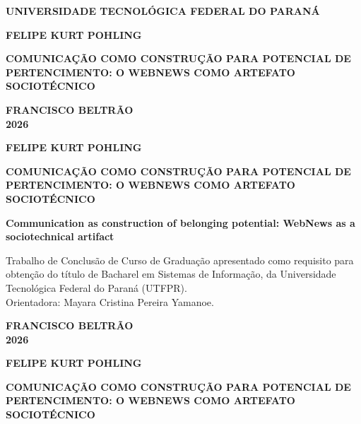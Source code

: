 \documentclass[12pt,a4paper]{article}
\newcommand{\autor}{FELIPE KURT POHLING}
\newcommand{\titulo}{COMUNICAÇÃO COMO CONSTRUÇÃO PARA POTENCIAL DE PERTENCIMENTO: O WEBNEWS COMO ARTEFATO SOCIOTÉCNICO}
\newcommand{\tituloingles}{Communication as construction of belonging potential: WebNews as a sociotechnical artifact}
\newcommand{\cidade}{FRANCISCO BELTRÃO}
\newcommand{\ano}{2026}
\newcommand{\natureza}{Trabalho de Conclusão de Curso de Graduação
  apresentado como requisito para obtenção do título de Bacharel em
  Sistemas de Informação, da Universidade Tecnológica Federal do Paraná
  (UTFPR).}
\begin{document}
\frenchspacing

\begin{center}
  \begin{onehalfspace}
  \textbf{UNIVERSIDADE TECNOLÓGICA FEDERAL DO PARANÁ}

  \vspace{3cm}

  \textbf{\autor}

  \vfill

  \textbf{\titulo}

  \vfill
  \vfill

  \textbf{\cidade}\\
  \textbf{\ano}
  \end{onehalfspace}
\end{center}
\clearpage

\begin{center}
  \begin{onehalfspace}
  \textbf{\autor}

  \vspace{4cm}

  \textbf{\titulo}

  \vspace{1.5cm}

  \textbf{\tituloingles}
  \end{onehalfspace}
\end{center}

\vspace{1cm}

\hfill
\begin{minipage}{0.5\textwidth}
  \small\singlespacing
  \natureza\\
  Orientadora: Mayara Cristina Pereira Yamanoe.
\end{minipage}

\vfill

\begin{center}
  \begin{onehalfspace}
  \textbf{\cidade}\\
  \textbf{\ano}
  \end{onehalfspace}
\end{center}
\clearpage

\begin{center}
  \begin{onehalfspace}
  \textbf{\autor}

  \vspace{1.5cm}

  \textbf{\titulo}
  \end{onehalfspace}
\end{center}
\end{document}
